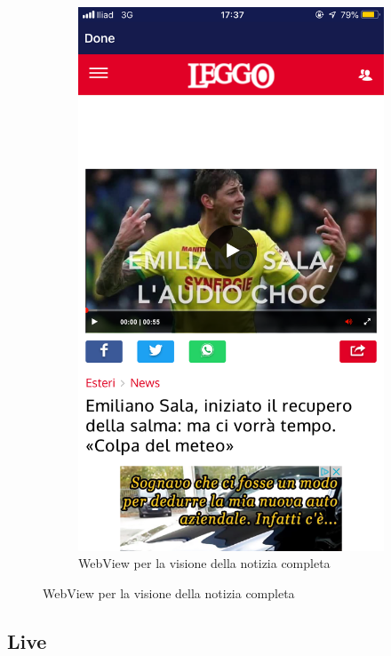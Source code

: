 \documentclass[numbers=noenddot, 12pt, a4paper, oneside]{scrbook}
\begin{document}
\begin{figure}[H]
\begin{subfigure}{.5\textwidth}
		\includegraphics[width=.8\linewidth]{images/Screen/WebView}
		\caption{WebView per la visione della notizia completa}
	\end{subfigure}
\end{figure}

\subsection*{Live}
\end{document}
